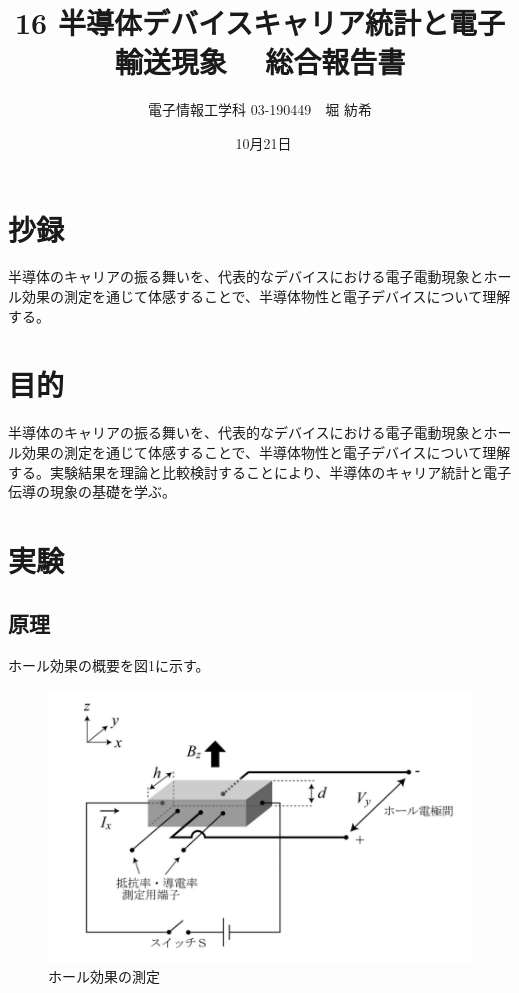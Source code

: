 \documentclass[dvipdfmx]{jsarticle}
\begin{document}
\title{16 半導体デバイスキャリア統計と電子輸送現象　 総合報告書}
\author{電子情報工学科 03-190449　堀 紡希}
\date{\ 10月21日}
\maketitle


\section{抄録}
半導体のキャリアの振る舞いを、代表的なデバイスにおける電子電動現象とホール効果の測定を通じて体感することで、半導体物性と電子デバイスについて理解する。
\section{目的}
半導体のキャリアの振る舞いを、代表的なデバイスにおける電子電動現象とホール効果の測定を通じて体感することで、半導体物性と電子デバイスについて理解する。実験結果を理論と比較検討することにより、半導体のキャリア統計と電子伝導の現象の基礎を学ぶ。
\section{実験}

\subsection{原理}
ホール効果の概要を図1に示す。
\begin{figure}[H]
\begin{center}
\includegraphics[scale = 0.6]{figure1.png}
\caption{ホール効果の測定}
\end{center}
\end{figure}
\end{document}

